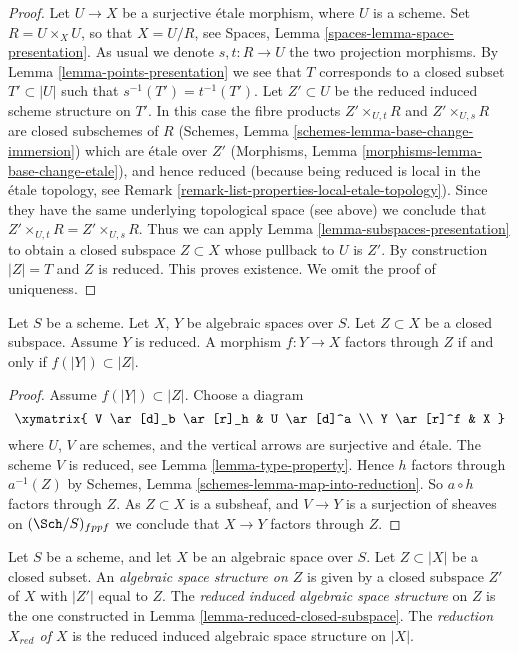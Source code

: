 \begin{proof}
Let $U \to X$ be a surjective \'etale morphism, where $U$ is a scheme.
Set $R = U \times_X U$, so that $X = U/R$, see
Spaces, Lemma \ref{spaces-lemma-space-presentation}.
As usual we denote $s, t : R \to U$ the two projection morphisms.
By Lemma \ref{lemma-points-presentation}
we see that $T$ corresponds to a closed subset $T' \subset |U|$ such
that $s^{-1}(T') = t^{-1}(T')$.
Let $Z' \subset U$ be the reduced induced scheme structure on $T'$.
In this case the fibre products
$Z' \times_{U, t} R$ and $Z' \times_{U, s} R$ are closed subschemes
of $R$
(Schemes, Lemma \ref{schemes-lemma-base-change-immersion})
which are \'etale over $Z'$
(Morphisms, Lemma \ref{morphisms-lemma-base-change-etale}),
and hence reduced
(because being reduced is local in the \'etale topology, see
Remark \ref{remark-list-properties-local-etale-topology}).
Since they have the same underlying topological space (see above)
we conclude that $Z' \times_{U, t} R = Z' \times_{U, s} R$.
Thus we can apply Lemma \ref{lemma-subspaces-presentation}
to obtain a closed subspace $Z \subset X$ whose pullback to $U$ is $Z'$.
By construction $|Z| = T$ and $Z$ is reduced. This proves existence.
We omit the proof of uniqueness.
\end{proof}

\begin{lemma}
\label{lemma-map-into-reduction}
Let $S$ be a scheme.
Let $X$, $Y$ be algebraic spaces over $S$.
Let $Z \subset X$ be a closed subspace.
Assume $Y$ is reduced.
A morphism $f : Y \to X$ factors through $Z$ if and only if
$f(|Y|) \subset |Z|$.
\end{lemma}

\begin{proof}
Assume $f(|Y|) \subset |Z|$. Choose a diagram
$$
\xymatrix{
V \ar[d]_b \ar[r]_h & U \ar[d]^a \\
Y \ar[r]^f & X
}
$$
where $U$, $V$ are schemes, and the vertical arrows are surjective and
\'etale. The scheme $V$ is reduced, see
Lemma \ref{lemma-type-property}.
Hence $h$ factors through $a^{-1}(Z)$ by
Schemes, Lemma \ref{schemes-lemma-map-into-reduction}.
So $a \circ h$ factors through $Z$.
As $Z \subset X$ is a subsheaf, and $V \to Y$ is a surjection of sheaves
on $(\Sch/S)_{fppf}$ we conclude that $X \to Y$ factors
through $Z$.
\end{proof}

\begin{definition}
\label{definition-reduced-induced-space}
Let $S$ be a scheme, and let $X$ be an algebraic space over $S$.
Let $Z \subset |X|$ be a closed subset.
An {\it algebraic space structure on $Z$} is given by a closed subspace
$Z'$ of $X$ with $|Z'|$ equal to $Z$.
The {\it reduced induced algebraic space structure}
on $Z$ is the one constructed in
Lemma \ref{lemma-reduced-closed-subspace}.
The {\it reduction $X_{red}$ of $X$} is the reduced induced algebraic
space structure on $|X|$.
\end{definition}











